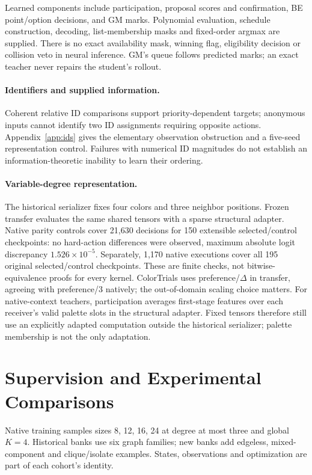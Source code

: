 \documentclass[10pt]{article}
\begin{document}
Learned components include participation, proposal scores and confirmation,
BE point/option decisions, and GM marks. Polynomial evaluation, schedule
construction, decoding, list-membership masks and fixed-order argmax are
supplied. There is no exact availability mask, winning flag, eligibility
decision or collision veto in neural inference. GM's queue follows predicted
marks; an exact teacher never repairs the student's rollout.



\paragraph{Identifiers and supplied information.}
Coherent relative ID comparisons support priority-dependent targets; anonymous
inputs cannot identify two ID assignments requiring opposite actions.
Appendix~\ref{app:ids} gives the elementary observation obstruction and a
five-seed representation control. Failures with numerical ID magnitudes do
not establish an information-theoretic inability to learn their ordering.


\paragraph{Variable-degree representation.}
The historical serializer fixes four colors and three neighbor positions.
Frozen transfer evaluates the same shared tensors with a sparse structural
adapter. Native parity controls cover 21,630 decisions for 150 extensible
selected/control checkpoints: no hard-action differences were observed,
maximum absolute logit discrepancy $1.526\times10^{-5}$. Separately, 1,170
native executions cover all 195 original selected/control checkpoints.
These are finite checks, not bitwise-equivalence proofs for every kernel.
ColorTrials uses preference/$\Delta$ in transfer, agreeing with preference/3
natively; the out-of-domain scaling choice matters.
For native-context teachers, participation averages first-stage features
over each receiver's valid palette slots in the structural adapter. Fixed
tensors therefore still use an explicitly adapted computation outside the
historical serializer; palette membership is not the only adaptation.

\section{Supervision and Experimental Comparisons}
\label{sec:learning}
Native training samples sizes 8, 12, 16, 24 at degree at most three and
global $K=4$. Historical banks use six graph families; new banks add
edgeless, mixed-component and clique/isolate examples. States, observations
and optimization are part of each cohort's identity.
\end{document}

